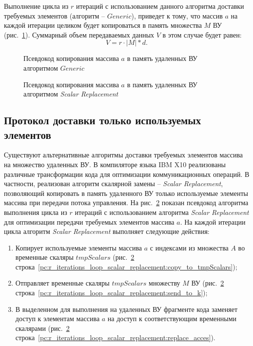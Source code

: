 Выполнение цикла из $r$ итераций с использованием данного алгоритма доставки 
требуемых элементов (алгоритм -- $Generic$), приведет к тому, что массив $a$ на 
каждой итерации целиком будет копироваться в память множества $M$ ВУ 
(рис.~\ref{list:r_iterations_loop_generic}). Суммарный объем передаваемых данных
$V$ в этом случае будет равен: 
\[ V = r \cdot |M| * d. \]
\begin{figure}[!h]
	
    \caption{Псевдокод копирования массива $a$ в память удаленных ВУ алгоритмом 
$Generic$}
    \label{list:r_iterations_loop_generic}
\end{figure}

\begin{figure}[!h]
	
    \caption{Псевдокод копирования массива $a$ в память удаленных ВУ алгоритмом 
\textit{Scalar Replacement}}
    \label{list:r_iterations_loop_scalar_replacement}
\end{figure}


\subsection{Протокол доставки только используемых элементов}
Существуют альтернативные алгоритмы доставки требуемых элементов массива на 
множество удаленных ВУ. В компиляторе языка IBM X10 реализованы различные 
трансформации кода для оптимизации коммуникационных операций. В частности, 
реализован алгоритм скалярной замены -- \textit{Scalar Replacement}, позволяющий
копировать в память удаленного ВУ только используемые элементы массива при
передачи потока управления.
На рис.~\ref{list:r_iterations_loop_scalar_replacement} показан псевдокод
алгоритма выполнения цикла из $r$ итераций с использованием алгоритма
\textit{Scalar Replacement} для оптимизации передачи требуемых элементов массива
$a$. На каждой итерации цикла алгоритм \textit{Scalar Replacement} выполняет
следующие действия:
\begin{enumerate}
\item Копирует используемые элементы массива $a$ с индексами из множества $A$ во
временные скаляры $tmpScalars$ 
(рис.~\ref{list:r_iterations_loop_scalar_replacement} 
строка~\ref{pc:r_iterations_loop_scalar_replacement:copy_to_tmpScalars});
\item Отправляет временные скаляры $tmpScalars$ множеству $M$ ВУ 
(рис.~\ref{list:r_iterations_loop_scalar_replacement} 
строка~\ref{pc:r_iterations_loop_scalar_replacement:send_to_k});
\item В выделенном для выполнения на удаленных ВУ фрагменте кода заменяет доступ
к элементам массива $a$ на доступ к соответствующим временными скалярами 
(рис.~\ref{list:r_iterations_loop_scalar_replacement} 
строка~\ref{pc:r_iterations_loop_scalar_replacement:replace_acces}).
\end{enumerate}
 
